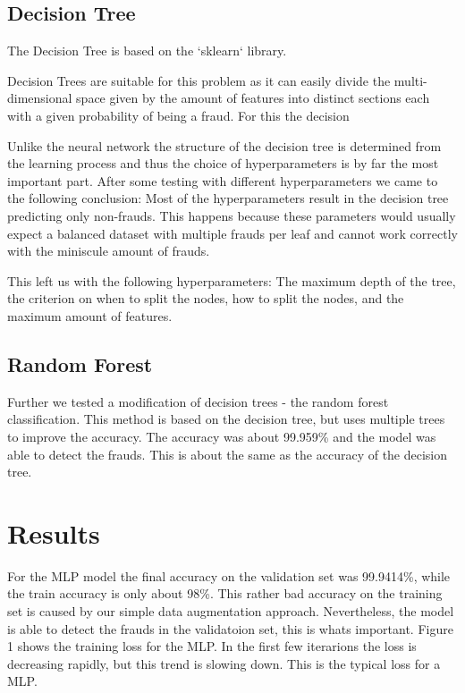 \documentclass[a4paper, 10pt, conference]{ieeeconf}      %
\begin{document}
\subsection{Decision Tree}

The Decision Tree is based on the `sklearn` library. 

Decision Trees are suitable for this problem as it can easily divide the multi-dimensional space given by the amount of features into distinct sections each with a given probability of being a fraud. For this the decision 

Unlike the neural network the structure of the decision tree is determined from the learning process and thus the choice of hyperparameters is by far the most important part.
After some testing with different hyperparameters we came to the following conclusion: Most of the hyperparameters result in the decision tree predicting only non-frauds. 
This happens because these parameters would usually expect a balanced dataset with multiple frauds per leaf and cannot work correctly with the miniscule amount of frauds.

This left us with the following hyperparameters: The maximum depth of the tree, the criterion on when to split the nodes, how to split the nodes, and the maximum amount of features. 



\subsection{Random Forest}

Further we tested a modification of decision trees - the random forest classification. This method is based on the decision tree, but uses multiple trees to improve the accuracy. 
The accuracy was about 99.959\% and the model was able to detect the frauds. This is about the same as the accuracy of the decision tree. 


\section{Results}
\label{sec:results}
For the MLP model the final accuracy on the validation set was 99.9414\%, while the train accuracy is only about 98\%. 
This rather bad accuracy on the training set is caused by our simple data augmentation approach. Nevertheless, the model is able to detect the frauds in the validatoion set, this is whats important. 
Figure 1 shows the training loss for the MLP. In the first few iterarions the  loss is decreasing rapidly, but this trend is slowing down. This is the typical loss for a MLP. 
\end{document}
